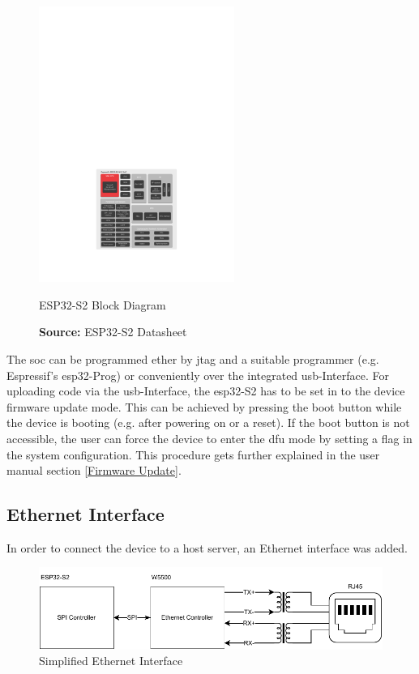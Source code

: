 \begin{figure}[h!]
	\centering
	\includegraphics[height=9cm]{images/esp32-s2_block_diagram}
	\caption{ESP32-S2 Block Diagram}
	\vspace{-1.4ex}
	\caption*{\textbf{Source:} ESP32-S2 Datasheet \cite{esp32-s2_datasheet}}
	\label{fig:esp32-s2_block_diagram}
\end{figure}

The \acrshort{soc} can be programmed ether by \acrshort{jtag} and a suitable programmer (e.g. Espressif's \gls{esp32}-Prog) or conveniently over the integrated \acrshort{usb}-Interface.\newline
For uploading code via the \acrshort{usb}-Interface, the \gls{esp32}-S2 has to be set in to the device firmware update mode. This can be achieved by pressing the boot button while the device is booting (e.g. after powering on or a reset). If the boot button is not accessible, the user can force the device to enter the \acrshort{dfu} mode by setting a flag in the system configuration. This procedure gets further explained in the user manual section \ref{Firmware Update}.
\newpage

\subsection{Ethernet Interface}
In order to connect the device to a host server, an Ethernet interface was added.

\begin{figure}[h!]
	\centering
	\includegraphics[width=\textwidth]{images/eth_interface}
	\vspace{0.2cm}
	\caption{Simplified Ethernet Interface}
	\label{fig:eth-interface}
\end{figure}

